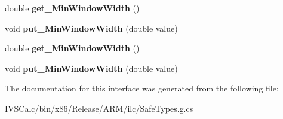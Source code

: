 \begin{DoxyCompactItemize}
\item 
\mbox{\label{interface_windows_1_1_u_i_1_1_xaml_1_1_i_adaptive_trigger_a1e216a296607bc714b8ec9160bed0c09}} 
double {\bfseries get\+\_\+\+Min\+Window\+Width} ()
\item 
\mbox{\label{interface_windows_1_1_u_i_1_1_xaml_1_1_i_adaptive_trigger_aba26990e4c1675dc1ec8fd9e58c8e01c}} 
void {\bfseries put\+\_\+\+Min\+Window\+Width} (double value)
\item 
\mbox{\label{interface_windows_1_1_u_i_1_1_xaml_1_1_i_adaptive_trigger_a1e216a296607bc714b8ec9160bed0c09}} 
double {\bfseries get\+\_\+\+Min\+Window\+Width} ()
\item 
\mbox{\label{interface_windows_1_1_u_i_1_1_xaml_1_1_i_adaptive_trigger_aba26990e4c1675dc1ec8fd9e58c8e01c}} 
void {\bfseries put\+\_\+\+Min\+Window\+Width} (double value)
\end{DoxyCompactItemize}


The documentation for this interface was generated from the following file\+:\begin{DoxyCompactItemize}
\item 
I\+V\+S\+Calc/bin/x86/\+Release/\+A\+R\+M/ilc/Safe\+Types.\+g.\+cs\end{DoxyCompactItemize}
